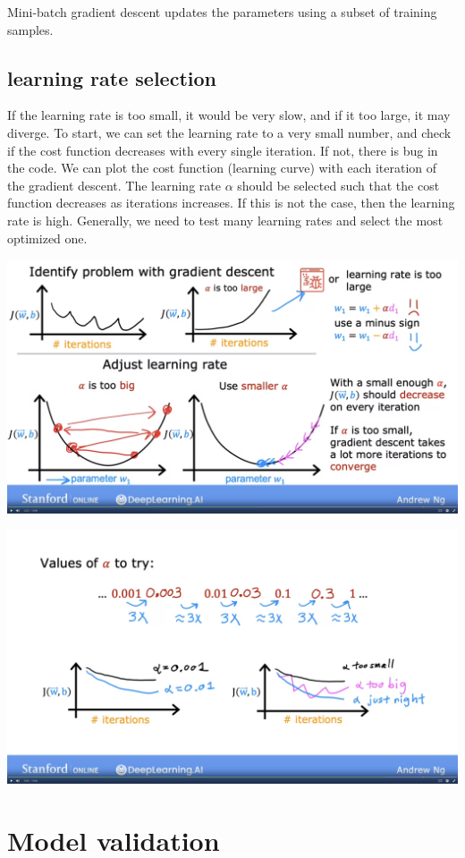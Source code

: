 \documentclass[12pt]{report}
\begin{document}
Mini-batch gradient descent updates the parameters using a subset of training samples.

\subsection{learning rate selection}
If the learning rate is too small, it would be very slow, and if it too large, it may diverge. To start, we can set the learning rate to a very small number, and check if the cost function decreases with every single iteration. If not, there is bug in the code. We can plot the cost function (learning curve) with each iteration of the gradient descent. The learning rate $\alpha$ should be selected such that the cost function decreases as iterations increases. If this is not the case, then the learning rate is high. Generally, we need to test many learning rates and select the most optimized one.

\includegraphics[scale=0.12]{pics/LearningRate.png}

\includegraphics[scale=0.12]{pics/learningrate2.png}


\section{Model validation}
\end{document}

